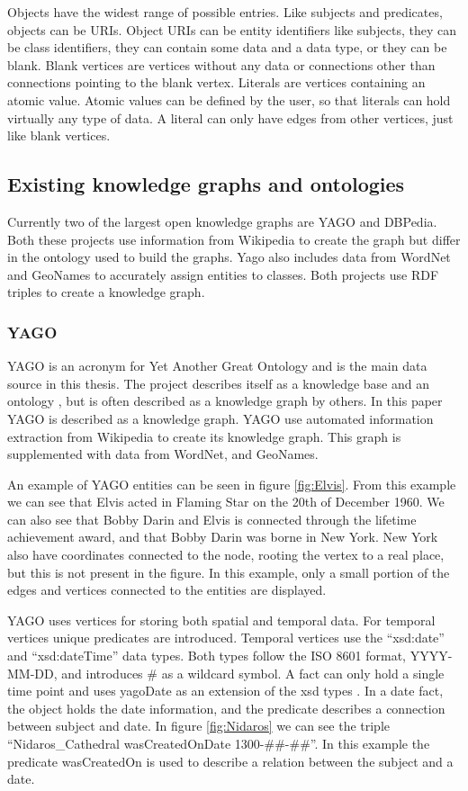 Objects have the widest range of possible entries. Like subjects and predicates, objects can be URIs. Object URIs can be entity identifiers like subjects, they can be class identifiers, they can contain some data and a data type, or they can be blank. Blank vertices are vertices without any data or connections other than connections pointing to the blank vertex. Literals are vertices containing an atomic value. Atomic values can be defined by the user, so that literals can hold virtually any type of data. A literal can only have edges from other vertices, just like blank vertices.

\subsection{Existing knowledge graphs and ontologies}
Currently two of the largest open knowledge graphs are YAGO and DBPedia. Both these projects use information from Wikipedia to create the graph but differ in the ontology used to build the graphs. Yago also includes data from WordNet and GeoNames to accurately assign entities to classes. Both projects use RDF triples to create a knowledge graph.

\subsubsection{YAGO}
YAGO is an acronym for Yet Another Great Ontology and is the main data source in this thesis. The project describes itself as a knowledge base \cite{yago} and an ontology \cite{mahdisoltani:hal-01699874}, but is often described as a knowledge graph by others. In this paper YAGO is described as a knowledge graph. YAGO use automated information extraction from Wikipedia to create its knowledge graph. This graph is supplemented with data from WordNet, and GeoNames.

An example of YAGO entities can be seen in figure \ref{fig:Elvis}. From this example we can see that Elvis acted in Flaming Star on the 20th of December 1960. We can also see that Bobby Darin and Elvis is connected through the lifetime achievement award, and that Bobby Darin was borne in New York. New York also have coordinates connected to the node, rooting the vertex to a real place, but this is not present in the figure. In this example, only a small portion of the edges and vertices connected to the entities are displayed.

YAGO uses vertices for storing both spatial and temporal data. For temporal vertices unique predicates \cite{yago} are introduced. Temporal vertices use the ``xsd:date'' and ``xsd:dateTime'' data types. Both types follow the ISO 8601 format, YYYY-MM-DD, and introduces \# as a wildcard symbol. A fact can only hold a single time point and uses yagoDate as an extension of the xsd types \cite{yago}. In a date fact, the object holds the date information, and the predicate describes a connection between subject and date. In figure \ref{fig:Nidaros} we can see the triple ``Nidaros\_Cathedral wasCreatedOnDate 1300-\#\#-\#\#''. In this example the predicate wasCreatedOn is used to describe a relation between the subject and a date.

